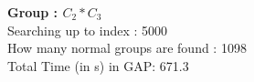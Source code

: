 \textbf{Group : $C_2*C_3$}\\
Searching up to index : 5000\\
How many normal groups are found : 1098\\
Total Time (in s) in GAP: 671.3\\
